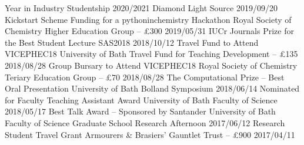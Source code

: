 \begin{cvpubs}
  \cvpub
    {Year in Industry Studentship 2020/2021}
    {Diamond Light Source}
    {2019/09/20}
  \cvpub
    {Kickstart Scheme Funding for a pythoninchemistry Hackathon}
    {Royal Society of Chemistry Higher Education Group -- £300}
    {2019/05/31}
  \cvpub
    {IUCr Journals Prize for the Best Student Lecture}
    {SAS2018}
    {2018/10/12}
  \cvpub
    {Travel Fund to Attend VICEPHEC18}
    {University of Bath Travel Fund for Teaching Development -- £135}
    {2018/08/28}
  \cvpub
    {Group Bursary to Attend VICEPHEC18}
    {Royal Society of Chemistry Teriary Education Group -- £70}
    {2018/08/28}
  \cvpub
    {The Computational Prize -- Best Oral Presentation}
    {University of Bath Bolland Symposium}
    {2018/06/14}
  \cvpub
    {Nominated for Faculty Teaching Assistant Award}
    {University of Bath Faculty of Science}
    {2018/05/17}
  \cvpub
    {Best Talk Award -- Sponsored by Santander}
    {University of Bath Faculty of Science Graduate School Research Afternoon}
    {2017/06/12}
  \cvpub
    {Research Student Travel Grant}
    {Armourers \& Brasiers' Gauntlet Trust -- £900}
    {2017/04/11}
\end{cvpubs}
